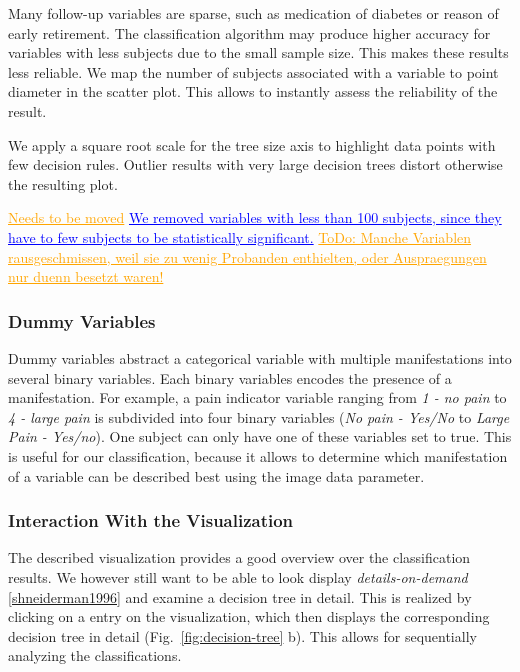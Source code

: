 \documentclass[a4paper,twoside]{style/article}
\newcommand{\add}[1]{\textcolor{blue}{\uline{#1}}}
\newcommand{\com}[1]{\textcolor{orange}{\uline{#1}}}
\begin{document}
Many follow-up variables are sparse, such as medication of diabetes or reason of early retirement.
The classification algorithm may produce higher accuracy for variables with less subjects due to the small sample size.
This makes these results less reliable.
We map the number of subjects associated with a variable to point diameter in the scatter plot.
This allows to instantly assess the reliability of the result.

We apply a square root scale for the tree size axis to highlight data points with few decision rules.
Outlier results with very large decision trees distort otherwise the resulting plot.

\com{Needs to be moved}
\add{We removed variables with less than 100 subjects, since they have to few subjects to be statistically significant.}
\com{ToDo: Manche Variablen rausgeschmissen, weil sie zu wenig Probanden enthielten, oder Auspraegungen nur duenn besetzt waren!}

%
\subsubsection{Dummy Variables}
Dummy variables abstract a categorical variable with multiple manifestations into several binary variables.
Each binary variables encodes the presence of a manifestation.
For example, a pain indicator variable ranging from \emph{1 - no pain} to \emph{4 - large pain} is subdivided into four binary variables (\emph{No pain - Yes/No} to \emph{Large Pain - Yes/no}).
One subject can only have one of these variables set to true.
This is useful for our classification, because it allows to determine which manifestation of a variable can be described best using the image data parameter.
\subsubsection{Interaction With the Visualization}
The described visualization provides a good overview over the classification results.
We however still want to be able to look display \emph{details-on-demand} \ref{shneiderman1996} and examine a decision tree in detail.
This is realized by clicking on a entry on the visualization, which then displays the corresponding decision tree in detail (Fig.~\ref{fig:decision-tree} b).
This allows for sequentially analyzing the classifications.
\end{document}
